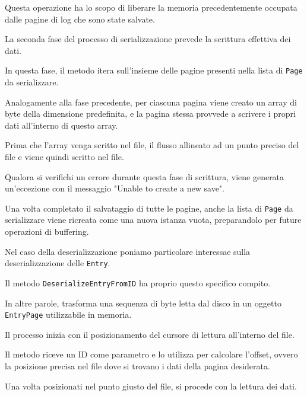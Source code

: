 \documentclass[12pt,a4paper,openright,twoside]{book}
\begin{document}
                    Questa operazione ha lo scopo di liberare la memoria precedentemente occupata dalle pagine di log che sono state salvate.

                    \pagebreak

                    La seconda fase del processo di serializzazione prevede la scrittura effettiva dei dati.

                    In questa fase, il metodo itera sull'insieme delle pagine presenti nella lista di \texttt{Page} da serializzare.

                    Analogamente alla fase precedente, per ciascuna pagina viene creato un array di byte della dimensione predefinita, e la pagina stessa provvede a scrivere i propri dati all'interno di questo array.

                    Prima che l'array venga scritto nel file, il flusso allineato ad un punto preciso del file e viene quindi scritto nel file.

                    Qualora si verifichi un errore durante questa fase di scrittura, viene generata un'eccezione con il messaggio "Unable to create a new save".

                    Una volta completato il salvataggio di tutte le pagine, anche la lista di \texttt{Page} da serializzare viene ricreata come una nuova istanza vuota, preparandolo per future operazioni di buffering.

                    

                    \clearpage

                    Nel caso della deserializzazione poniamo particolare interessae sulla deserializzazione delle \texttt{Entry}.

                    Il metodo \texttt{DeserializeEntryFromID} ha proprio questo specifico compito.

                    In altre parole, trasforma una sequenza di byte letta dal disco in un oggetto \texttt{EntryPage} utilizzabile in memoria.

                    Il processo inizia con il posizionamento del cursore di lettura all'interno del file.

                    Il metodo riceve un ID come parametro e lo utilizza per calcolare l'offset, ovvero la posizione precisa nel file dove si trovano i dati della pagina desiderata.

                    Una volta posizionati nel punto giusto del file, si procede con la lettura dei dati.
\end{document}

